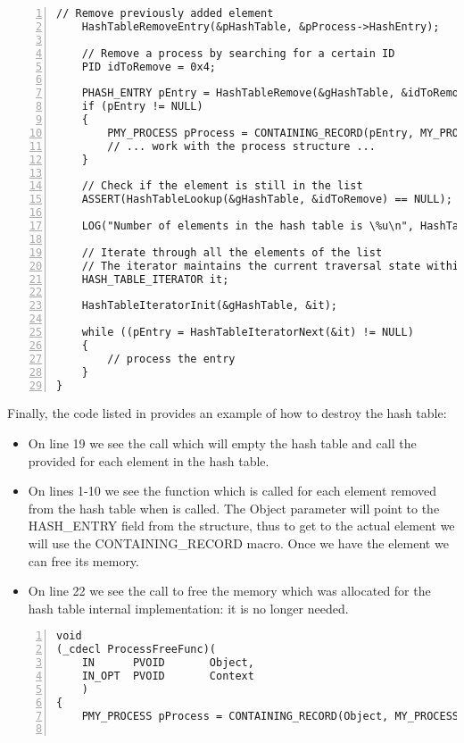 \begin{appendices}
\begin{lstlisting}[caption={Hash Usage Example},label={lst:HashUsageEg},numbers=left]
	// Remove previously added element
	HashTableRemoveEntry(&pHashTable, &pProcess->HashEntry);
	
	// Remove a process by searching for a certain ID
	PID idToRemove = 0x4;
	
	PHASH_ENTRY pEntry = HashTableRemove(&gHashTable, &idToRemove);
	if (pEntry != NULL)
	{
		PMY_PROCESS pProcess = CONTAINING_RECORD(pEntry, MY_PROCESS, HASH_ENTRY);
		// ... work with the process structure ...
	}
	
	// Check if the element is still in the list
	ASSERT(HashTableLookup(&gHashTable, &idToRemove) == NULL);
	
	LOG("Number of elements in the hash table is \%u\n", HashTableSize(&gHashTable));
	
	// Iterate through all the elements of the list
	// The iterator maintains the current traversal state within the hash table
	HASH_TABLE_ITERATOR it;
	
	HashTableIteratorInit(&gHashTable, &it);
	
	while ((pEntry = HashTableIteratorNext(&it) != NULL)
	{
		// process the entry
	}
}
\end{lstlisting}

Finally, the code listed in  provides an example of how to destroy the
hash table:
\begin{itemize}
	\item On line 19 we see the call which will empty the hash table and call the provided
	 for each element in the hash table.
	
	\item On lines 1-10 we see the function which is called for each element removed from the hash
	table when  is called. The Object parameter will point to the HASH\_ENTRY
	field from the structure, thus to get to the actual element we will use the CONTAINING\_RECORD
	macro. Once we have the element we can free its memory.
	
	\item On line 22 we see the call to free the memory which was allocated for the hash table
	internal implementation: it is no longer needed.
\end{itemize}

\begin{lstlisting}[caption={Hash Destruction Example},label={lst:HashDestEg},numbers=left]
void
(_cdecl ProcessFreeFunc)(
    IN      PVOID       Object,
    IN_OPT  PVOID       Context
    )
{
	PMY_PROCESS pProcess = CONTAINING_RECORD(Object, MY_PROCESS, HashEntry);
	

\end{lstlisting}
\end{appendices}
